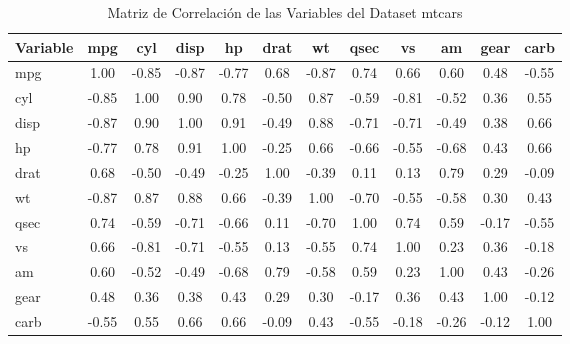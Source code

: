 \documentclass{article}
\begin{document}
\begin{table}[h]
	\centering
	\begin{tabular}{lccccccccccc}
		\hline
		Variable & mpg   & cyl   & disp  & hp    & drat  & wt    & qsec  & vs    & am    & gear  & carb  \\ \hline
		mpg      & 1.00  & -0.85 & -0.87 & -0.77 & 0.68  & -0.87 & 0.74  & 0.66  & 0.60  & 0.48  & -0.55 \\
		cyl      & -0.85 & 1.00  & 0.90  & 0.78  & -0.50 & 0.87  & -0.59 & -0.81 & -0.52 & 0.36  & 0.55  \\
		disp     & -0.87 & 0.90  & 1.00  & 0.91  & -0.49 & 0.88  & -0.71 & -0.71 & -0.49 & 0.38  & 0.66  \\
		hp       & -0.77 & 0.78  & 0.91  & 1.00  & -0.25 & 0.66  & -0.66 & -0.55 & -0.68 & 0.43  & 0.66  \\
		drat     & 0.68  & -0.50 & -0.49 & -0.25 & 1.00  & -0.39 & 0.11  & 0.13  & 0.79  & 0.29  & -0.09 \\
		wt       & -0.87 & 0.87  & 0.88  & 0.66  & -0.39 & 1.00  & -0.70 & -0.55 & -0.58 & 0.30  & 0.43  \\
		qsec     & 0.74  & -0.59 & -0.71 & -0.66 & 0.11  & -0.70 & 1.00  & 0.74  & 0.59  & -0.17 & -0.55 \\
		vs       & 0.66  & -0.81 & -0.71 & -0.55 & 0.13  & -0.55 & 0.74  & 1.00  & 0.23  & 0.36  & -0.18 \\
		am       & 0.60  & -0.52 & -0.49 & -0.68 & 0.79  & -0.58 & 0.59  & 0.23  & 1.00  & 0.43  & -0.26 \\
		gear     & 0.48  & 0.36  & 0.38  & 0.43  & 0.29  & 0.30  & -0.17 & 0.36  & 0.43  & 1.00  & -0.12 \\
		carb     & -0.55 & 0.55  & 0.66  & 0.66  & -0.09 & 0.43  & -0.55 & -0.18 & -0.26 & -0.12 & 1.00  \\ \hline
	\end{tabular}
	\caption{Matriz de Correlación de las Variables del Dataset mtcars}
	\label{tab:correlation_matrix}
\end{table}
\end{document}
